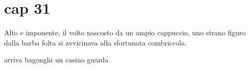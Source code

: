 \chapter{cap 31}

Alto e imponente, il volto nascosto da un ampio cappuccio, uno strano
figuro dalla barba folta si avvicinava alla sfortunata combriccola.


arriva bagonghi un casino guarda
